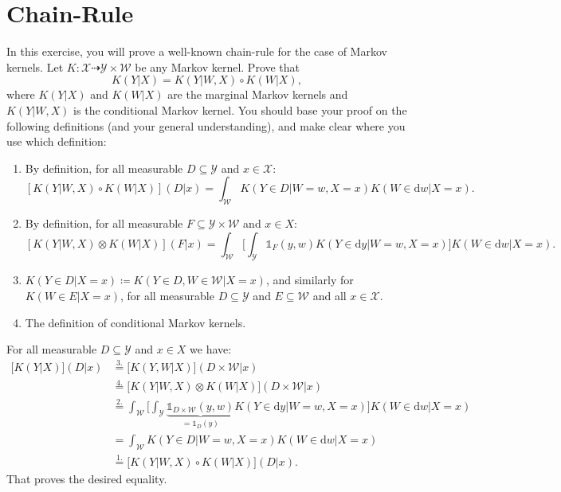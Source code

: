 \documentclass[11pt,a4paper]{article}
\begin{document}
\section{Chain-Rule}

In this exercise, you will prove a well-known chain-rule for the case of Markov kernels. 
Let $K: \mathcal{X} \dashrightarrow \mathcal{Y} \times \mathcal{W}$ be any Markov kernel. 
Prove that 
\begin{equation*}
  K(Y | X) = K(Y | W, X) \circ K(W | X),
\end{equation*}
where $K(Y | X)$ and $K(W | X)$ are the marginal Markov kernels and $K(Y | W, X)$ is the conditional Markov kernel.
You should base your proof on the following definitions (and your general understanding), and make clear where you use which definition:
\begin{enumerate}
  \item By definition, for all measurable $D \subseteq \mathcal{Y}$ and $x \in \mathcal{X}$: 
    \begin{equation*}
      \left[ K(Y | W, X) \circ K(W | X)\right](D | x) = \int_{\mathcal{W}} K(Y \in D | W = w, X = x) K(W \in \text{d} w | X = x).
    \end{equation*}
  \item By definition, for all measurable $F \subseteq \mathcal{Y} \times \mathcal{W}$ and $x \in X$:
    \begin{equation*}
      \left[ K(Y | W, X) \otimes K(W | X)\right](F | x) = \int_{\mathcal{W}} \bigg[ \int_{\mathcal{Y}} \mathds{1}_{F}(y, w) K(Y \in \text{d} y | W = w, X = x) \bigg] K(W \in \text{d} w | X = x).
  \end{equation*}
\item  $K(Y \in D | X = x) \coloneq K(Y \in D, W \in \mathcal{W} | X = x)$, and similarly for $K(W \in E | X = x)$, for all measurable $D \subseteq \mathcal{Y}$ and $E \subseteq \mathcal{W}$ and all $x \in \mathcal{X}$.
\item The definition of conditional Markov kernels.  
  \end{enumerate} 

  \begin{gradedsolution}
    For all measurable $D \subseteq \mathcal{Y}$ and $x \in X$ we have:
\begin{align*}
  \big[ K(Y | X) \big] (D | x) & \overset{3.}{=} \big[ K(Y, W | X)\big] (D \times \mathcal{W} | x) \\
  & \overset{4.}{=} \big[ K(Y | W, X) \otimes K(W | X)\big] (D \times \mathcal{W} | x) \\
  & \overset{2.}{=} \int_{\mathcal{W}} \bigg[ \int_{\mathcal{Y}} \underbrace{\mathds{1}_{D \times \mathcal{W}}(y, w)}_{= \mathds{1}_D(y)} K(Y \in \text{d} y | W = w, X = x)\bigg] K(W \in \text{d} w | X = x) \\
  & = \int_{\mathcal{W}} K(Y \in D | W = w, X = x) K(W \in \text{d} w | X = x) \\
  & \overset{1.}{=} \big[  K(Y | W, X) \circ K(W | X)\big] (D | x).
\end{align*}
That proves the desired equality.
  \end{gradedsolution}
\end{document}
